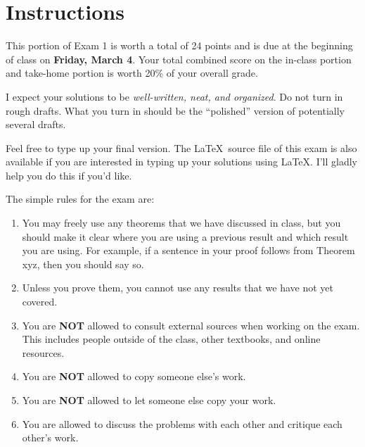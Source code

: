 \documentclass[11pt]{scrartcl}
\theoremstyle{definition}
\begin{document}
\begin{center}

  
  \bigskip
  

\end{center}

\section*{Instructions}

This portion of Exam 1 is worth a total of 24 points and is due at the beginning of class on \textbf{Friday, March 4}.  Your total combined score on the in-class portion and take-home portion is worth 20\% of your overall grade.  

\bigskip

I expect your solutions to be \emph{well-written, neat, and organized}.  Do not turn in rough drafts.  What you turn in should be the ``polished'' version of potentially several drafts.  
 
\bigskip

Feel free to type up your final version.  The \LaTeX\ source file of this exam is also available if you are interested in typing up your solutions using \LaTeX.  I'll gladly help you do this if you'd like.

\bigskip

The simple rules for the exam are:

\begin{enumerate}
\item You may freely use any theorems that we have discussed in class, but you should make it clear where you are using a previous result and which result you are using.  For example, if a sentence in your proof follows from Theorem xyz, then you should say so. 
\item Unless you prove them, you cannot use any results that we have not yet covered.
\item You are \textbf{NOT} allowed to consult external sources when working on the exam.  This includes people outside of the class, other textbooks, and online resources.
\item You are \textbf{NOT} allowed to copy someone else's work.
\item You are \textbf{NOT} allowed to let someone else copy your work.
\item You are allowed to discuss the problems with each other and critique each other's work.
\end{enumerate}
\end{document}
